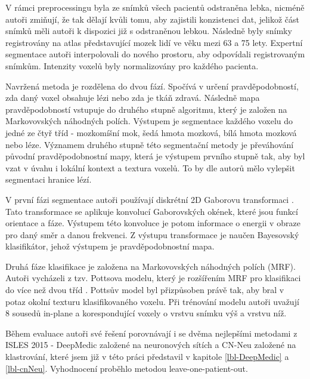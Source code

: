 \documentclass[11pt]{article}
\begin{document}
V rámci preprocessingu byla ze snímků všech pacientů odstraněna lebka, nicméně autoři zmiňují, že tak dělají kvůli tomu, aby zajistili konzistenci dat, jelikož část snímků měli autoři k dispozici již s odstraněnou lebkou. Následně byly snímky registrovány na atlas \cite{LEMAITRE2005900} představující mozek lidí ve věku mezi 63 a 75 lety. Expertní segmentace autoři interpolovali do nového prostoru, aby odpovídali registrovaným snímkům. Intenzity voxelů byly normalizovány pro každého pacienta.

Navržená metoda je rozdělena do dvou fází. Spočívá v určení pravděpodobností, zda daný voxel obsahuje lézi nebo zda je tkáň zdravá. Následně mapa pravděpodobností vstupuje do druhého stupně algoritmu, který je založen na \alert{Markovovských náhodných polích}. Výstupem je segmentace každého voxelu do jedné ze čtyř tříd - mozkomíšní mok, šedá hmota mozková, bílá hmota mozková nebo léze. Významem druhého stupně této segmentační metody je převáhování původní pravděpodobnostní mapy, která je výstupem prvního stupně tak, aby byl vzat v úvahu i lokální kontext a textura voxelů. To by dle autorů mělo vylepšit segmentaci hranice lézí.

V první fázi segmentace autoři používají diskrétní 2D Gaborovu transformaci \cite{ZIBULSKI1997188}. Tato transformace se aplikuje konvolucí Gaborovských okének, které jsou funkcí orientace a fáze. Výstupem této konvoluce je potom informace o energii v obraze pro daný směr a danou frekvenci. Z výstupu transformace je naučen Bayesovský klasifikátor, jehož výstupem je pravděpodobnostní mapa.

Druhá fáze klasifikace je založena na Markovovských náhodných polích (MRF). Autoři vycházeli z tzv. Pottsova modelu, který je rozšířením MRF pro klasifikaci do více než dvou tříd \cite{koller2009probabilistic}. Pottsův model byl přizpůsoben právě tak, aby bral v potaz okolní texturu klasifikovaného voxelu. Při trénování modelu autoři uvažují 8 sousedů in-plane a korespondující voxely o vrstvu snímku výš a vrstvu níž.

Během evaluace autoři své řešení porovnávají i se dvěma nejlepšími metodami z ISLES 2015 - DeepMedic založené na neuronových sítích a CN-Neu založené na klastrování, které jsem již v této práci představil v kapitole \ref{lbl-DeepMedic} a \ref{lbl-cnNeu}. Vyhodnocení proběhlo metodou leave-one-patient-out.
\end{document}
